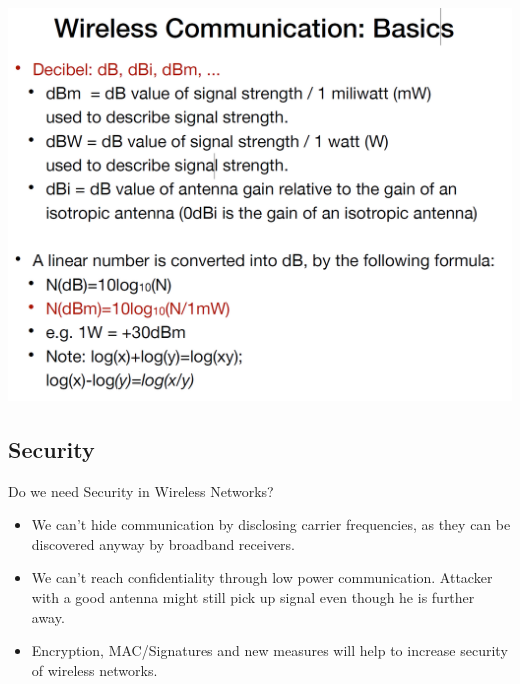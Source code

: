\begin{minipage}{\linewidth}
    \centering      
    \includegraphics[width=\linewidth]{Figures/L1_signal_measures.PNG}
\end{minipage}

\subsection{Security}
Do we need Security in Wireless Networks?
\begin{itemize}
    \item We can't hide communication by disclosing carrier frequencies, as they can be discovered anyway by broadband receivers.
    \item We can't reach confidentiality through low power communication. Attacker with a good antenna might still pick up signal even though he is further away.
    \item Encryption, MAC/Signatures and new measures will help to increase security of wireless networks.
\end{itemize}
